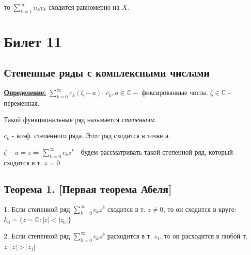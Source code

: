 \documentclass[a4paper,12pt]{article} %
\begin{document}
\hspace*{40 mm}то $\sum\limits_{k=1}^{\infty} u_k v_k$ сходится равномерно на $X$.



\newpage
\section{Билет 11}
	\subsection{Степенные ряды с комплексными числами}
	
	\underline{\textbf{Определение:}} $\sum\limits_{k = 0}^\infty c_k(\zeta - a)$; $c_k, a \in \mathbb{C} -$ фиксированные числа, $\zeta \in \mathbb{C}$  - переменная.
	
	Такой функциональные ряд называется \textit{степенным}.
	
	$c_k$ - коэф. степенного ряда. Этот ряд сходится в точке а.
	
	$\zeta - a = z \Rightarrow \sum\limits_{k = 0}^\infty c_k z^k$ - будем рассматривать такой степенной ряд, который сходится в т. $z = 0$
	
	\subsection{Теорема 1. [Первая теорема Абеля]}
	
	1. Если степенной ряд $\sum\limits_{k = 0}^\infty c_k z^k$ сходится в т. $z \neq 0$, то он сходится в круге: $k_0 = \{z = \mathbb{C}: |z| < |z_0|\}$
	
	2. Если степенной ряд $\sum\limits_{k = 0}^\infty c_k z^k$ расходится в т. $z_1$, то он расходится в любой т. $z: |z| > |z_1|$ 
	
\end{document}
